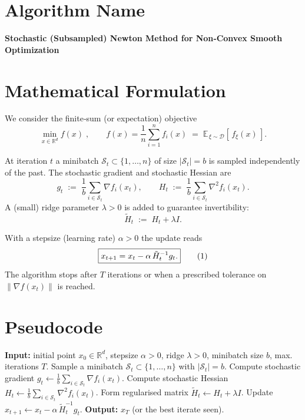 \documentclass{article}
\newcommand{\EE}{\mathbb{E}}
\newcommand{\RR}{\mathbb{R}}
\newcommand{\norm}[1]{\left\|#1\right\|}
\begin{document}
\section*{Algorithm Name}
\textbf{Stochastic (Subsampled) Newton Method for Non‑Convex Smooth Optimization}

\section*{Mathematical Formulation}
We consider the finite‑sum (or expectation) objective
\[
\min_{x\in\RR^{d}} f(x)\;,\qquad 
f(x)=\frac{1}{n}\sum_{i=1}^{n} f_i(x)
        \;=\;\EE_{\,\xi\sim\mathcal D}[\,f_{\xi}(x)\,] .
\]

At iteration $t$ a minibatch $\mathcal S_t\subset\{1,\dots,n\}$ of size $|\mathcal S_t|=b$ is sampled
independently of the past.  The stochastic gradient and stochastic Hessian are
\[
g_t \;:=\; \frac{1}{b}\sum_{i\in\mathcal S_t}\nabla f_i(x_t),\qquad
H_t \;:=\; \frac{1}{b}\sum_{i\in\mathcal S_t}\nabla^{2} f_i(x_t).
\]
A (small) ridge parameter $\lambda>0$ is added to guarantee invertibility:
\[
\tilde H_t \;:=\; H_t + \lambda I .
\]

With a stepsize (learning rate) $\alpha>0$ the update reads
\begin{equation}
\boxed{%
x_{t+1}=x_t-\alpha\,\tilde H_t^{-1} g_t.}
\tag{1}
\end{equation}
The algorithm stops after $T$ iterations or when a prescribed tolerance on
$\norm{\nabla f(x_t)}$ is reached.

\section*{Pseudocode}
\begin{algorithm}[H]
\caption{Stochastic Subsampled Newton}
\begin{algorithmic}[1]
\STATE \textbf{Input:} initial point $x_0\in\RR^{d}$, stepsize $\alpha>0$, ridge $\lambda>0$, minibatch size $b$, max. iterations $T$.
    \STATE Sample a minibatch $\mathcal S_t\subset\{1,\dots,n\}$ with $|\mathcal S_t|=b$.
    \STATE Compute stochastic gradient 
          $g_t\gets \frac1b\sum_{i\in\mathcal S_t}\nabla f_i(x_t)$.
    \STATE Compute stochastic Hessian 
          $H_t\gets \frac1b\sum_{i\in\mathcal S_t}\nabla^{2}f_i(x_t)$.
    \STATE Form regularised matrix $\tilde H_t\gets H_t+\lambda I$.
    \STATE Update $x_{t+1}\gets x_t-\alpha\,\tilde H_t^{-1} g_t$.
\ENDFOR
\STATE \textbf{Output:} $x_T$ (or the best iterate seen).
\end{algorithmic}
\end{algorithm}
\end{document}
